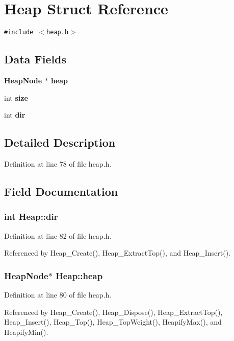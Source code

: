 \section{Heap Struct Reference}
\label{structHeap}
{\tt \#include $<$heap.h$>$}

\subsection*{Data Fields}
\begin{CompactItemize}
\item 
\bf{Heap\-Node} $\ast$ \bf{heap}
\item 
int \bf{size}
\item 
int \bf{dir}
\end{CompactItemize}


\subsection{Detailed Description}




Definition at line 78 of file heap.h.

\subsection{Field Documentation}
\subsubsection{\setlength{\rightskip}{0pt plus 5cm}int \bf{Heap::dir}}\label{structHeap_15f7de0f5288ccdb8cca4779dedf2c3a}




Definition at line 82 of file heap.h.

Referenced by Heap\_\-Create(), Heap\_\-Extract\-Top(), and Heap\_\-Insert().
\subsubsection{\setlength{\rightskip}{0pt plus 5cm}\bf{Heap\-Node}$\ast$ \bf{Heap::heap}}\label{structHeap_cf7d5be6b552c70304700e8dc1c19e0f}




Definition at line 80 of file heap.h.

Referenced by Heap\_\-Create(), Heap\_\-Dispose(), Heap\_\-Extract\-Top(), Heap\_\-Insert(), Heap\_\-Top(), Heap\_\-Top\-Weight(), Heapify\-Max(), and Heapify\-Min().

